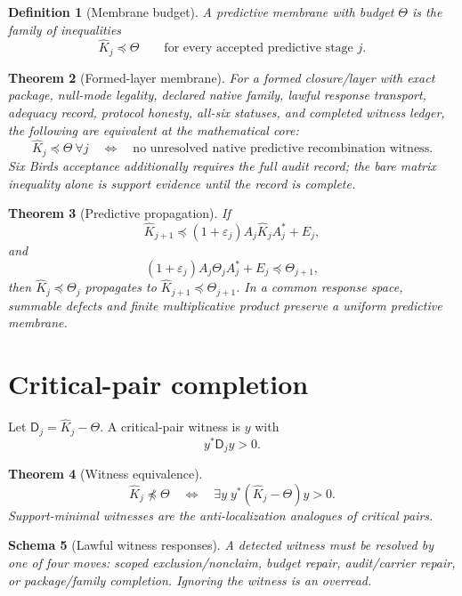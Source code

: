 \documentclass[11pt]{article}
\newtheorem{theorem}{Theorem}[section]
\newtheorem{definition}[theorem]{Definition}
\newtheorem{schema}[theorem]{Schema}
\begin{document}
\begin{definition}[Membrane budget]
A predictive membrane with budget \(\Theta\) is the family of inequalities
\[
  \widehat K_j\preceq\Theta\qquad\text{for every accepted predictive stage }j.
\]
\end{definition}

\begin{theorem}[Formed-layer membrane]
For a formed closure/layer with exact package, null-mode legality, declared native family, lawful response transport, adequacy record, protocol honesty, all-six statuses, and completed witness ledger, the following are equivalent at the mathematical core:
\[
\widehat K_j\preceq\Theta\ \forall j
\quad\Longleftrightarrow\quad
\text{no unresolved native predictive recombination witness}.
\]
Six Birds acceptance additionally requires the full audit record; the bare matrix inequality alone is support evidence until the record is complete.
\end{theorem}

\begin{theorem}[Predictive propagation]
If
\[
\widehat K_{j+1}\preceq(1+\varepsilon_j)A_j\widehat K_jA_j^*+E_j,
\]
and
\[
(1+\varepsilon_j)A_j\Theta_jA_j^*+E_j\preceq\Theta_{j+1},
\]
then \(\widehat K_j\preceq\Theta_j\) propagates to \(\widehat K_{j+1}\preceq\Theta_{j+1}\).  In a common response space, summable defects and finite multiplicative product preserve a uniform predictive membrane.
\end{theorem}

\section{Critical-pair completion}
Let \(\mathsf D_j=\widehat K_j-\Theta\).  A critical-pair witness is \(y\) with
\[
  y^*\mathsf D_jy>0.
\]

\begin{theorem}[Witness equivalence]
\[
  \widehat K_j\npreceq\Theta
  \quad\Longleftrightarrow\quad
  \exists y\; y^*(\widehat K_j-\Theta)y>0.
\]
Support-minimal witnesses are the anti-localization analogues of critical pairs.
\end{theorem}

\begin{schema}[Lawful witness responses]
A detected witness must be resolved by one of four moves: scoped exclusion/nonclaim, budget repair, audit/carrier repair, or package/family completion.  Ignoring the witness is an overread.
\end{schema}
\end{document}
